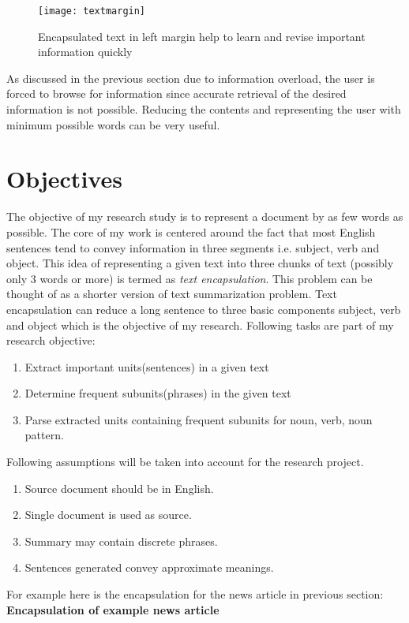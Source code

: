 \begin{figure}[h]
 
\texttt{[image: textmargin]}
 \caption{\singlespace Encapsulated text in left margin help to learn and revise 
important information quickly}
\end{figure}
As discussed in the previous section due to information overload, the user is 
forced to browse for information since accurate retrieval of the desired 
information
is not possible. Reducing the contents and representing the user with minimum 
possible words can be very useful. 
\section{Objectives}\label{ch1:obj}
The objective of my research study is to represent a document by as few words as 
possible. The core of my work is centered around the fact that most English 
sentences 
tend to convey information in three segments i.e. subject, verb and object. This 
idea of representing a given text into three chunks of text (possibly only 3 
words
 or more) is termed as \emph{text encapsulation}. This problem can be thought of 
as a  shorter version of text summarization problem. Text encapsulation can 
reduce a long 
 sentence to three basic components subject, verb and object which is the 
objective of my research. 
 Following tasks are part of my research objective:

\begin{enumerate}
 \item Extract important units(sentences) in a given text
 \item Determine frequent subunits(phrases) in the given text
 \item Parse extracted units containing frequent subunits for noun, verb, noun 
pattern.
\end{enumerate}

Following assumptions will be taken into account for the research project.
\begin{enumerate}
 \item Source document should be in English.
 \item Single document is used as source. 
 \item Summary may contain discrete phrases.
 \item Sentences generated convey approximate meanings.
\end{enumerate}

For example here is the encapsulation for the news article in previous section:\\
\textbf{Encapsulation of example news article}

